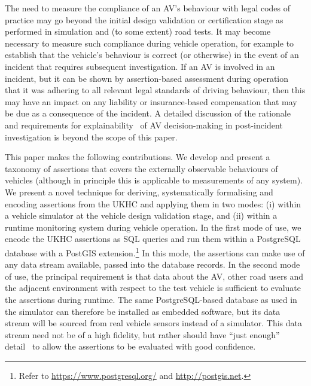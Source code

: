 The need to measure the compliance of an AV's behaviour with legal codes of practice may go beyond the initial design validation or certification stage as performed in simulation and (to some extent) road tests. It may become necessary to measure such compliance during vehicle operation, for example to establish that the vehicle's behaviour is correct (or otherwise) in the event of an incident that requires subsequent investigation. If an AV is involved in an incident, but it can be shown by assertion-based assessment during operation that it was adhering to all relevant legal standards of driving behaviour, then this may have an impact on any liability or insurance-based compensation that may be due as a consequence of the incident. A detailed discussion of the rationale and requirements for explainability~\cite{rosenfeld2019explainability} of AV decision-making in post-incident investigation is beyond the scope of this paper.



This paper makes the following contributions. 
%
We develop and present a taxonomy of assertions that covers the externally observable behaviours of vehicles (although in principle this is applicable to measurements of any system). 
%
We present a novel technique for deriving, systematically formalising and encoding assertions from the UKHC and applying them in two modes: (i) within a %
vehicle simulator at the vehicle design validation stage, and (ii) within a runtime monitoring system during vehicle operation.
%
In the first mode of use, we encode the UKHC assertions as SQL queries and run them within a PostgreSQL database with a PostGIS extension.\footnote{Refer to \url{https://www.postgresql.org/} and \url{http://postgis.net}.} In this mode, the assertions can make use of any data stream available, passed into the database records.
%
In the second mode of use, the principal requirement is that data about the AV, other road users and the adjacent environment with respect to the test vehicle is sufficient to evaluate the assertions during runtime. The same PostgreSQL-based database as used in the simulator can therefore be installed as embedded software, but its data stream will be sourced from real vehicle sensors instead of a simulator. This data stream need not be of a high fidelity, but rather should have ``just enough'' detail~\cite{Koopman2018} to allow the assertions to be evaluated with good confidence.





